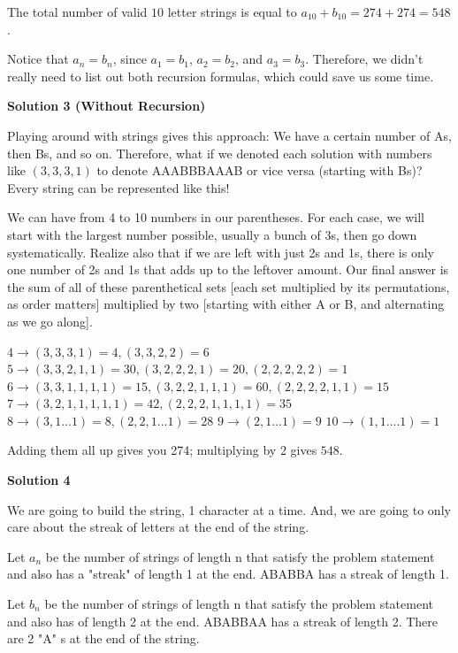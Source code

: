 \begin{enumerate}
 The total number of valid $10$ letter strings is equal to $a_{10}+b_{10}=274+274=\boxed{548}$.

 Notice that $a_n = b_n$, since $a_1=b_1$, $a_2=b_2$, and $a_3=b_3$.  Therefore, we didn't really need to list out both recursion formulas, which could save us some time.

 



\textbf{Solution 3 (Without Recursion)}

Playing around with strings gives this approach: We have a certain number of As, then Bs, and so on. Therefore, what if we denoted each solution with numbers like $(3,3,3,1)$ to denote AAABBBAAAB or vice versa (starting with Bs)? Every string can be represented like this!

 We can have from 4 to 10 numbers in our parentheses. For each case, we will start with the largest number possible, usually a bunch of 3s, then go down systematically. Realize also that if we are left with just 2s and 1s, there is only one number of 2s and 1s that adds up to the leftover amount. Our final answer is the sum of all of these parenthetical sets [each set multiplied by its permutations, as order matters] multiplied by two [starting with either A or B, and alternating as we go along].

 $4 \rightarrow (3,3,3,1) = 4, (3,3,2,2) = 6$
$5 \rightarrow (3, 3, 2, 1, 1) = 30, (3, 2, 2, 2, 1) = 20, (2,2,2,2,2)=1$
$6 \rightarrow (3,3,1,1,1,1) = 15, (3,2,2,1,1,1) = 60, (2,2,2,2,1,1) = 15$
$7 \rightarrow (3,2,1,1,1,1,1) = 42, (2,2,2,1,1,1,1) = 35$
$8 \rightarrow (3,1...1) = 8, (2,2,1...1) = 28$
$9 \rightarrow (2,1...1) = 9$
$10 \rightarrow (1,1....1) =1$

 Adding them all up gives you 274; multiplying by 2 gives $\boxed{548}$.

 



\textbf{Solution 4}

We are going to build the string, 1 character at a time. And, we are going to only care about the streak of letters at the end of the string.

 Let $a_n$ be the number of strings of length n that satisfy the problem statement and also has a "streak" of length 1 at the end. ABABBA has a streak of length 1.

 Let $b_n$ be the number of strings of length n that satisfy the problem statement and also has of length 2 at the end. ABABBAA has a streak of length 2. There are 2 "A" s at the end of the string.


\end{enumerate}
